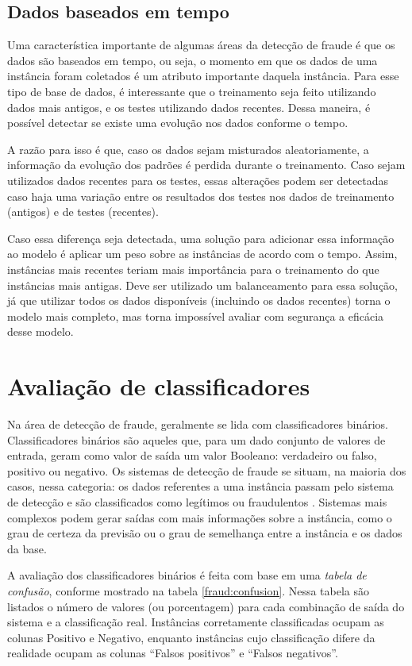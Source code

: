 \subsection{Dados baseados em tempo}

Uma característica importante de algumas áreas da detecção de fraude é que os dados são baseados em tempo, ou seja, o momento em que os dados de uma instância foram coletados é um atributo importante daquela instância. Para esse tipo de base de dados, é interessante que o treinamento seja feito utilizando dados mais antigos, e os testes utilizando dados recentes. Dessa maneira, é possível detectar se existe uma evolução nos dados conforme o tempo.

A razão para isso é que, caso os dados sejam misturados aleatoriamente, a informação da evolução dos padrões é perdida durante o treinamento. Caso sejam utilizados dados recentes para os testes, essas alterações podem ser detectadas caso haja uma variação entre os resultados dos testes nos dados de treinamento (antigos) e de testes (recentes).

Caso essa diferença seja detectada, uma solução para adicionar essa informação ao modelo é aplicar um peso sobre as instâncias de acordo com o tempo. Assim, instâncias mais recentes teriam mais importância para o treinamento do que instâncias mais antigas. Deve ser utilizado um balanceamento para essa solução, já que utilizar todos os dados disponíveis (incluindo os dados recentes) torna o modelo mais completo, mas torna impossível avaliar com segurança a eficácia desse modelo.

\section{Avaliação de classificadores}

Na área de detecção de fraude, geralmente se lida com classificadores binários. Classificadores binários são aqueles que, para um dado conjunto de valores de entrada, geram como valor de saída um valor Booleano: verdadeiro ou falso, positivo ou negativo. Os sistemas de detecção de fraude se situam, na maioria dos casos, nessa categoria: os dados referentes a uma instância passam pelo sistema de detecção e são classificados como legítimos ou fraudulentos \cite{Bewick2004}. Sistemas mais complexos podem gerar saídas com mais informações sobre a instância, como o grau de certeza da previsão ou o grau de semelhança entre a instância e os dados da base.

A avaliação dos classificadores binários é feita com base em uma \emph{tabela de confusão}, conforme mostrado na tabela \ref{fraud:confusion}. Nessa tabela são listados o número de valores (ou porcentagem) para cada combinação de saída do sistema e a classificação real. Instâncias corretamente classificadas ocupam as colunas Positivo e Negativo, enquanto instâncias cujo classificação difere da realidade ocupam as colunas ``Falsos positivos'' e ``Falsos negativos''.

